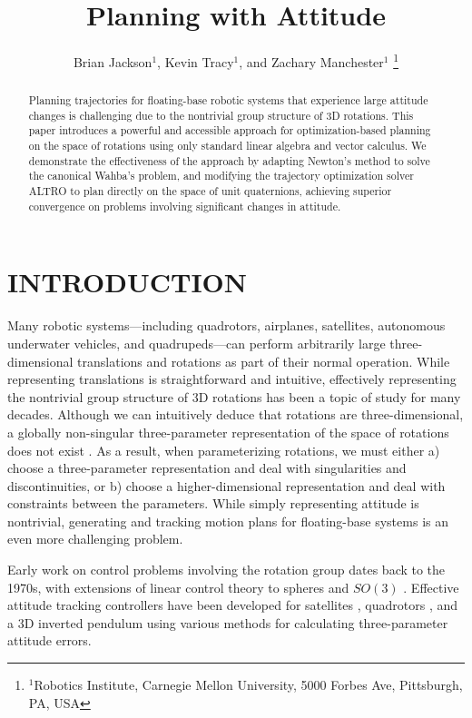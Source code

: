 \documentclass[letterpaper, 10 pt, conference]{ieeeconf}  %
\title{\LARGE \bf
Planning with Attitude
}
\author{Brian Jackson$^1$, Kevin Tracy$^1$, and Zachary Manchester$^1$%
    \thanks{
        $^1$Robotics Institute, 
        Carnegie Mellon University, 
        5000 Forbes Ave, Pittsburgh, PA, USA
    }
}
\begin{document}
\maketitle

\begin{abstract}
Planning trajectories for floating-base robotic systems that experience
large attitude changes is challenging due to the nontrivial group structure of 3D
rotations. This paper introduces a powerful and accessible approach for 
optimization-based planning on the space of rotations using only standard linear algebra and vector calculus. We demonstrate the effectiveness of the approach by adapting Newton's
method to solve the canonical Wahba's problem, and modifying the trajectory optimization solver ALTRO to plan directly on the space of unit 
quaternions, achieving superior convergence on problems involving significant changes 
in attitude.

\end{abstract}

\section{INTRODUCTION}

    Many robotic systems---including quadrotors, airplanes, satellites, autonomous
    underwater vehicles, and quadrupeds---can perform arbitrarily large three-dimensional
    translations and rotations as part of their normal operation. While representing
    translations is straightforward and intuitive, effectively representing the
    nontrivial group structure of 3D rotations has been a topic of study for many
    decades. Although we can intuitively deduce that rotations are three-dimensional, a
    globally non-singular three-parameter representation of the space of rotations does
    not exist \cite{stuelpnagel1964parametrization}. As a result, when parameterizing
    rotations, we must either a) choose a three-parameter representation and deal with
    singularities and discontinuities, or b) choose a higher-dimensional representation and deal with
    constraints between the parameters. While simply representing attitude is nontrivial,
    generating and tracking motion plans for floating-base systems is an even more
    challenging problem.

    Early work on control problems involving the rotation group dates back to the 1970s,
    with extensions of linear control theory to spheres \cite{Brockett1973} and $SO(3)$
    \cite{Baillieul1978}. Effective attitude tracking controllers have been developed for
    satellites \cite{wie1985quaternion}, quadrotors
    \cite{Fresk2013,Liu2015,lee2010geometric,
    Johnson2005,watterson2020control,mellinger2011minimum}, and a 3D inverted pendulum
    \cite{Chaturvedi2009} using various methods for calculating three-parameter attitude
    errors.
\end{document}
